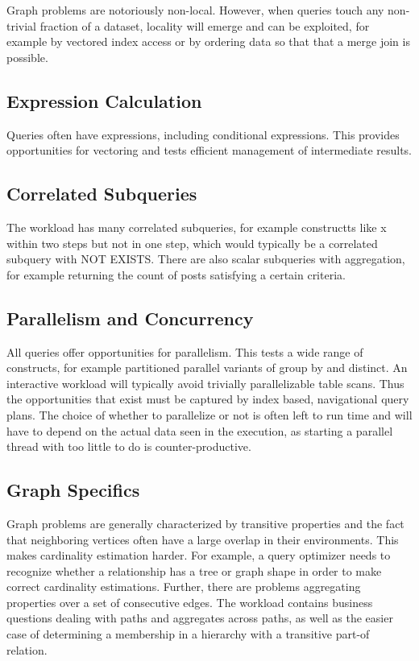 Graph problems are notoriously non-local.  However, when queries touch
any non-trivial fraction of a dataset, locality will emerge and can be
exploited, for example by vectored index access or by ordering data so
that that a merge join is possible.

\subsection{Expression Calculation}

Queries often have expressions, including conditional expressions.
This provides opportunities for vectoring and tests efficient
management of intermediate results.

\subsection{Correlated Subqueries}

The workload has many correlated subqueries, for example constructts
like x within two steps but not in one step, which would typically be
a correlated subquery with NOT EXISTS.  There are also scalar
subqueries with aggregation, for example returning the count of posts
satisfying a certain criteria.


\subsection{Parallelism and Concurrency}

All queries offer opportunities for parallelism.  This tests a wide
range of constructs, for example partitioned parallel variants of
group by and distinct.  An interactive workload will typically avoid
trivially parallelizable table scans.  Thus the opportunities that
exist must be captured by index based, navigational query plans.  The
choice of whether to parallelize or not is often left to run time and
will have to depend on the actual data seen in the execution, as
starting a parallel thread with too little to do is
counter-productive.


\subsection{Graph Specifics}

Graph problems are generally characterized by transitive properties
and the fact that neighboring vertices often have a large overlap in
their environments.  This makes cardinality estimation harder.  For
example, a query optimizer needs to recognize whether a relationship
has a tree or graph shape in order to make correct cardinality
estimations.  Further, there are problems aggregating properties over
a set of consecutive edges.  The workload contains business questions
dealing with paths and aggregates across paths, as well as the easier
case of determining a membership in a hierarchy with a transitive
part-of relation.
